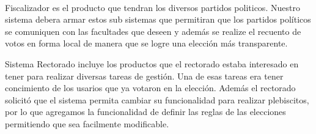 \\ \par
Fiscalizador es el producto que tendran los diversos partidos politicos. Nuestro sistema debera armar estos sub sistemas que permitiran que los partidos pol\'iticos se comuniquen con las facultades que deseen y además se realize el recuento de votos en forma local de manera que se logre una elección más transparente. 
\\ \par
Sistema Rectorado incluye los productos que el rectorado estaba interesado en tener para realizar diversas tareas de gestión. Una de esas tareas era tener concimiento de los usarios que ya votaron en la elección. Además el rectorado solicitó que el sistema permita cambiar su funcionalidad para realizar plebiscitos, por lo que agregamos la funcionalidad de definir las reglas de las elecciones permitiendo que sea facilmente modificable.

